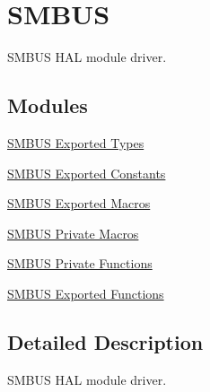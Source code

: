 \hypertarget{group___s_m_b_u_s}{}\section{S\+M\+B\+US}
\label{group___s_m_b_u_s}


S\+M\+B\+US H\+AL module driver.  


\subsection*{Modules}
\begin{DoxyCompactItemize}
\item 
\hyperlink{group___s_m_b_u_s___exported___types}{S\+M\+B\+U\+S Exported Types}
\item 
\hyperlink{group___s_m_b_u_s___exported___constants}{S\+M\+B\+U\+S Exported Constants}
\item 
\hyperlink{group___s_m_b_u_s___exported___macros}{S\+M\+B\+U\+S Exported Macros}
\item 
\hyperlink{group___s_m_b_u_s___private___macro}{S\+M\+B\+U\+S Private Macros}
\item 
\hyperlink{group___s_m_b_u_s___private___functions}{S\+M\+B\+U\+S Private Functions}
\item 
\hyperlink{group___s_m_b_u_s___exported___functions}{S\+M\+B\+U\+S Exported Functions}
\end{DoxyCompactItemize}


\subsection{Detailed Description}
S\+M\+B\+US H\+AL module driver. 

